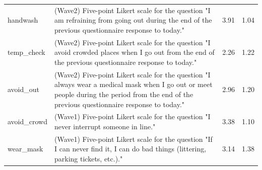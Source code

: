 \documentclass[
]{article}
\begin{document}
\begin{table}[!h]
\begin{tabular}[t]{l>{\raggedright\arraybackslash}p{30em}cc}
handwash & (Wave2) Five-point Likert scale for the question "I am refraining from going out during the end of the previous questionnaire response to today." & \num{3.91} & \num{1.04}\\
temp\_check & (Wave2) Five-point Likert scale for the question "I avoid crowded places when I go out from the end of the previous questionnaire response to today." & \num{2.26} & \num{1.22}\\
avoid\_out & (Wave2) Five-point Likert scale for the question "I always wear a medical mask when I go out or meet people during the period from the end of the previous questionnaire response to today." & \num{2.96} & \num{1.20}\\
avoid\_crowd & (Wave1) Five-point Likert scale for the question "I never interrupt someone in line." & \num{3.38} & \num{1.10}\\
wear\_mask & (Wave1) Five-point Likert scale for the question "If I can never find it, I can do bad things (littering, parking tickets, etc.)." & \num{3.14} & \num{1.38}\\
\bottomrule
\end{tabular}
\end{table}
\end{document}
